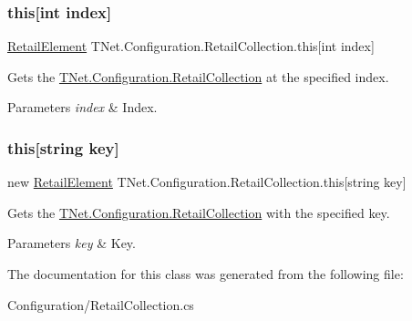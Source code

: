 \subsubsection{\texorpdfstring{this[int index]}{this[int index]}}
{\footnotesize\ttfamily \mbox{\hyperlink{class_t_net_1_1_configuration_1_1_retail_element}{Retail\+Element}} T\+Net.\+Configuration.\+Retail\+Collection.\+this\mbox{[}int index\mbox{]}\hspace{0.3cm}{\ttfamily [get]}}



Gets the \mbox{\hyperlink{class_t_net_1_1_configuration_1_1_retail_collection}{T\+Net.\+Configuration.\+Retail\+Collection}} at the specified index. 


\begin{DoxyParams}{Parameters}
{\em index} & Index.\\
\hline
\end{DoxyParams}
\mbox{\label{class_t_net_1_1_configuration_1_1_retail_collection_a2d8383359c5542feec7ccec8ae696aca}} 
\subsubsection{\texorpdfstring{this[string key]}{this[string key]}}
{\footnotesize\ttfamily new \mbox{\hyperlink{class_t_net_1_1_configuration_1_1_retail_element}{Retail\+Element}} T\+Net.\+Configuration.\+Retail\+Collection.\+this\mbox{[}string key\mbox{]}\hspace{0.3cm}{\ttfamily [get]}}



Gets the \mbox{\hyperlink{class_t_net_1_1_configuration_1_1_retail_collection}{T\+Net.\+Configuration.\+Retail\+Collection}} with the specified key. 


\begin{DoxyParams}{Parameters}
{\em key} & Key.\\
\hline
\end{DoxyParams}


The documentation for this class was generated from the following file\+:\begin{DoxyCompactItemize}
\item 
Configuration/Retail\+Collection.\+cs\end{DoxyCompactItemize}
